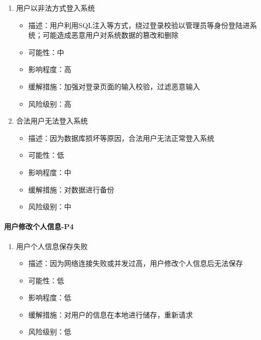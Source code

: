 \documentclass[hyperref, a4paper]{ctexart}
\providecommand{\tightlist}{%
  \setlength{\itemsep}{0pt}\setlength{\parskip}{0pt}}
\let\oldparagraph\paragraph
\renewcommand{\paragraph}[1]{\oldparagraph{#1}\mbox{}}
\begin{document}
\begin{enumerate}
\def\labelenumi{\arabic{enumi}.}
\tightlist
\item
  用户以非法方式登入系统

  \begin{itemize}
  \tightlist
  \item
    描述：用户利用SQL注入等方式，绕过登录校验以管理员等身份登陆进系统；可能造成恶意用户对系统数据的篡改和删除
  \item
    可能性：中
  \item
    影响程度：高
  \item
    缓解措施：加强对登录页面的输入校验，过滤恶意输入
  \item
    风险级别：高
  \end{itemize}
\item
  合法用户无法登入系统

  \begin{itemize}
  \tightlist
  \item
    描述：因为数据库损坏等原因，合法用户无法正常登入系统
  \item
    可能性：低
  \item
    影响程度：中
  \item
    缓解措施：对数据进行备份
  \item
    风险级别：中
  \end{itemize}
\end{enumerate}

\hypertarget{ux7528ux6237ux4feeux6539ux4e2aux4ebaux4fe1ux606f-p4}{%
\paragraph{用户修改个人信息-P4}\label{ux7528ux6237ux4feeux6539ux4e2aux4ebaux4fe1ux606f-p4}}

\begin{enumerate}
\def\labelenumi{\arabic{enumi}.}
\tightlist
\item
  用户个人信息保存失败

  \begin{itemize}
  \tightlist
  \item
    描述：因为网络连接失败或并发过高，用户修改个人信息后无法保存
  \item
    可能性：低
  \item
    影响程度：低
  \item
    缓解措施：对用户的信息在本地进行储存，重新请求
  \item
    风险级别：低
  \end{itemize}
\end{enumerate}
\end{document}

